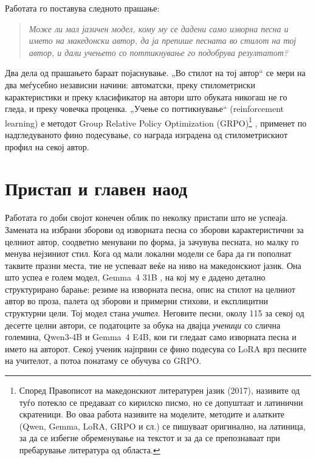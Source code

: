 Работата го поставува следното прашање:

\begin{quote}
\emph{Може ли мал јазичен модел, кому му се дадени само изворна песна и
името на македонски автор, да ја препише песната во стилот на тој автор,
и дали учењето со поттикнување го подобрува резултатот?}
\end{quote}

Два дела од прашањето бараат појаснување. „Во стилот на тој автор“ се мери
на два меѓусебно независни начини: автоматски, преку стилометриски
карактеристики и преку класификатор на автори што обуката никогаш не
го гледа, и преку човечка проценка. „Учење со поттикнување“ (reinforcement
learning) е методот Group Relative Policy Optimization (GRPO)\footnote{Според Правописот на македонскиот
литературен јазик (2017), називите од туѓо потекло се предаваат со кирилско писмо,
но се допуштаат и латинични скратеници. Во оваа работа називите на моделите,
методите и алатките (Qwen, Gemma, LoRA, GRPO и сл.) се пишуваат оригинално, на
латиница, за да се избегне обременување на текстот и за да се препознаваат при
пребарување литература од областа.}
\citep{shao2024deepseekmath}, применет по надгледуваното фино
подесување, со награда изградена од стилометрискиот профил на секој автор.

\section{Пристап и главен наод}

Работата го доби својот конечен облик по неколку пристапи што не успеаја.
Замената на избрани зборови од изворната песна со зборови карактеристични
за целниот автор, соодветно менувани по форма, ја зачувува песната, но
малку го менува нејзиниот стил. Кога од мали локални модели се бара да ги
пополнат таквите празни места, тие не успеваат веќе на ниво на
македонскиот јазик. Она што успеа е голем модел, Gemma~4 31B
\citep{gemma4}, на кој му е дадено детално структурирано барање: резиме на
изворната песна, опис на стилот на целниот автор во проза, палета од
зборови и примерни стихови, и експлицитни структурни цели. Тој модел стана
\emph{учител}. Неговите песни, околу 115 за секој од десетте целни автори,
се податоците за обука на двајца \emph{ученици} со слична големина,
Qwen3-4B \citep{yang2025qwen3} и Gemma~4 E4B, кои ги гледаат само изворната песна
и името на авторот. Секој ученик најпрвин се фино подесува со LoRA
\citep{hu2022lora} врз песните на учителот, а потоа
понатаму се обучува со GRPO.

